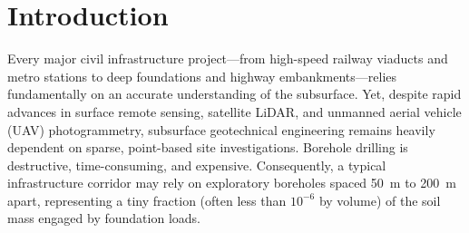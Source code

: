 \documentclass[11pt,a4paper]{article}
\begin{document}
\newpage

\section{Introduction}

Every major civil infrastructure project---from high-speed railway viaducts and metro stations to deep foundations and highway embankments---relies fundamentally on an accurate understanding of the subsurface. Yet, despite rapid advances in surface remote sensing, satellite LiDAR, and unmanned aerial vehicle (UAV) photogrammetry, subsurface geotechnical engineering remains heavily dependent on sparse, point-based site investigations. Borehole drilling is destructive, time-consuming, and expensive. Consequently, a typical infrastructure corridor may rely on exploratory boreholes spaced 50~m to 200~m apart, representing a tiny fraction (often less than $10^{-6}$ by volume) of the soil mass engaged by foundation loads.
\end{document}
